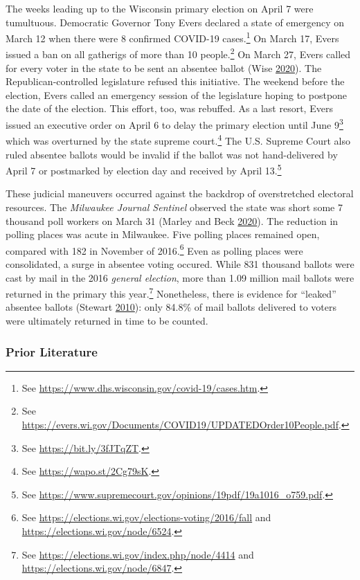 \documentclass[
  12pt,
]{article}
\begin{document}
The weeks leading up to the Wisconsin primary election on April 7 were tumultuous. Democratic Governor Tony Evers declared a state of emergency on March 12 when there were 8 confirmed COVID-19 cases.\footnote{See \url{https://www.dhs.wisconsin.gov/covid-19/cases.htm}.} On March 17, Evers issued a ban on all gatherigs of more than 10 people.\footnote{See \url{https://evers.wi.gov/Documents/COVID19/UPDATEDOrder10People.pdf}.} On March 27, Evers called for every voter in the state to be sent an absentee ballot (Wise \protect\hyperlink{ref-Wise2020}{2020}). The Republican-controlled legislature refused this initiative. The weekend before the election, Evers called an emergency session of the legislature hoping to postpone the date of the election. This effort, too, was rebuffed. As a last resort, Evers issued an executive order on April 6 to delay the primary election until June 9\footnote{See \url{https://bit.ly/3fJTqZT}.} which was overturned by the state supreme court.\footnote{See \url{https://wapo.st/2Cg79sK}.} The U.S. Supreme Court also ruled absentee ballots would be invalid if the ballot was not hand-delivered by April 7 or postmarked by election day and received by April 13.\footnote{See \url{https://www.supremecourt.gov/opinions/19pdf/19a1016_o759.pdf}.}

These judicial maneuvers occurred against the backdrop of overstretched electoral resources. The \emph{Milwaukee Journal Sentinel} observed the state was short some 7 thousand poll workers on March 31 (Marley and Beck \protect\hyperlink{ref-Marley2020}{2020}). The reduction in polling places was acute in Milwaukee. Five polling places remained open, compared with 182 in November of 2016.\footnote{See \url{https://elections.wi.gov/elections-voting/2016/fall} and \url{https://elections.wi.gov/node/6524}.} Even as polling places were consolidated, a surge in absentee voting occured. While 831 thousand ballots were cast by mail in the 2016 \emph{general election}, more than 1.09 million mail ballots were returned in the primary this year.\footnote{See \url{https://elections.wi.gov/index.php/node/4414} and \url{https://elections.wi.gov/node/6847}.} Nonetheless, there is evidence for ``leaked'' absentee ballots (Stewart \protect\hyperlink{ref-Stewart2010}{2010}): only 84.8\% of mail ballots delivered to voters were ultimately returned in time to be counted.

\hypertarget{prior-literature}{%
\subsubsection*{Prior Literature}\label{prior-literature}}
\end{document}
